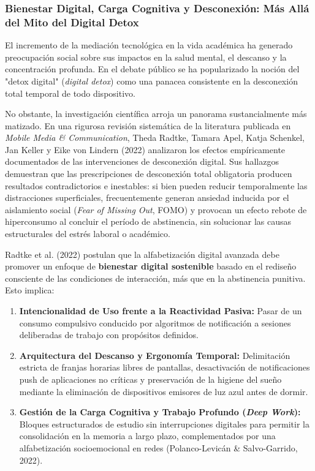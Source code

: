 \subsubsection{Bienestar Digital, Carga Cognitiva y Desconexión: Más Allá del Mito del Digital Detox}

El incremento de la mediación tecnológica en la vida académica ha generado preocupación social sobre sus impactos en la salud mental, el descanso y la concentración profunda. En el debate público se ha popularizado la noción del "detox digital" (\textit{digital detox}) como una panacea consistente en la desconexión total temporal de todo dispositivo.

No obstante, la investigación científica arroja un panorama sustancialmente más matizado. En una rigurosa revisión sistemática de la literatura publicada en \textit{Mobile Media \& Communication}, Theda Radtke, Tamara Apel, Katja Schenkel, Jan Keller y Eike von Lindern (2022) analizaron los efectos empíricamente documentados de las intervenciones de desconexión digital. Sus hallazgos demuestran que las prescripciones de desconexión total obligatoria producen resultados contradictorios e inestables: si bien pueden reducir temporalmente las distracciones superficiales, frecuentemente generan ansiedad inducida por el aislamiento social (\textit{Fear of Missing Out}, FOMO) y provocan un efecto rebote de hiperconsumo al concluir el período de abstinencia, sin solucionar las causas estructurales del estrés laboral o académico.

Radtke et al. (2022) postulan que la alfabetización digital avanzada debe promover un enfoque de \textbf{bienestar digital sostenible} basado en el rediseño consciente de las condiciones de interacción, más que en la abstinencia punitiva. Esto implica:
\begin{enumerate}
    \item \textbf{Intencionalidad de Uso frente a la Reactividad Pasiva:} Pasar de un consumo compulsivo conducido por algoritmos de notificación a sesiones deliberadas de trabajo con propósitos definidos.
    \item \textbf{Arquitectura del Descanso y Ergonomía Temporal:} Delimitación estricta de franjas horarias libres de pantallas, desactivación de notificaciones push de aplicaciones no críticas y preservación de la higiene del sueño mediante la eliminación de dispositivos emisores de luz azul antes de dormir.
    \item \textbf{Gestión de la Carga Cognitiva y Trabajo Profundo (\textit{Deep Work}):} Bloques estructurados de estudio sin interrupciones digitales para permitir la consolidación en la memoria a largo plazo, complementados por una alfabetización socioemocional en redes (Polanco-Levicán \& Salvo-Garrido, 2022).
\end{enumerate}

